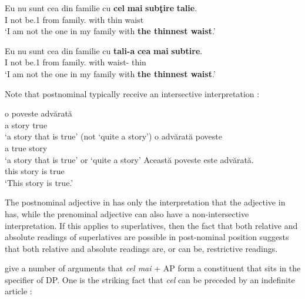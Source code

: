 \documentclass[output=paper
,modfonts
,nonflat]{langsci/langscibook}
\begin{document}
\ea \label{ex:coppockstrand:33}

\begin{xlist}

\ex \label{ex:coppockstrand:33a}
\gll Eu nu sunt cea din familie cu \textbf{cel} \textbf{mai} \textbf{subţire} \textbf{talie}.\\
I not be.1\sg{}  from family.\acc{} with  \cmpr{} thin waist\\
\glt `I am not the one in my family with \textbf{the thinnest waist}.'

\ex \label{ex:coppockstrand:33b}
\gll Eu nu sunt cea din familie cu \textbf{tali-a} \textbf{cea} \textbf{mai} \textbf{subtire}.\\
I not be.1\sg{}  from family.\acc{} with  waist-  \cmpr{} thin\\
\glt `I am not the one in my family with \textbf{the thinnest waist}.'
\end{xlist}
\z

Note that postnominal  typically receive an intersective interpretation \citep{Cornilescu1992,MarchisAlexadiou2009,Teodorescu2007}:

\ea \label{ex:coppockstrand:34}
\begin{xlist}
\ex \label{ex:coppockstrand:34a}
\gll o poveste advărată\\
a story true\\
\glt `a story that is true' (not `quite a story')
\ex 
\gll o advărată poveste\\
a true story\\
\glt `a story that is true' or `quite a story'\label{rom:prenominal-story}
\ex \label{ex:coppockstrand:34b}
\gll Această poveste este advărată.\\
this story is true\\
\glt `This story is true.'
\end{xlist}
\z

The postnominal adjective in  has only the interpretation that the adjective in  has, while the prenominal adjective can also have a non-intersective interpretation.
If this applies to superlatives, then the fact that both relative and absolute readings of superlatives are possible in post-nominal position suggests that both relative and absolute readings are, or can be, restrictive readings.

\citet{Dobrovie-SorinGiurgea2015} give a number of arguments that \textit{cel mai} + AP form a constituent that sits in the specifier of DP. One is the striking fact that
\textit{cel} can be preceded by an indefinite article \citep[15, ex.\ 64]{Dobrovie-SorinGiurgea2015}:
\end{document}
